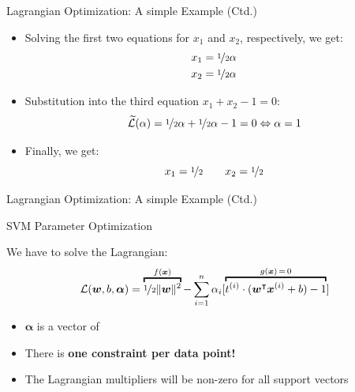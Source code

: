 \begin{frame}{Lagrangian Optimization: A simple Example (Ctd.)}{}
	\begin{itemize}
		\item Solving the first two equations for $x_1$ and $x_2$, respectively, we get:
		\begin{align}
			x_1 &= \nicefrac{1}{2} \alpha \\
			x_2 &= \nicefrac{1}{2} \alpha
		\end{align}
		\item Substitution into the third equation $x_1 + x_2 - 1 = 0$:
		\begin{equation}
			\widetilde{\mathcal{L}}(\alpha) =
				\nicefrac{1}{2} \alpha + \nicefrac{1}{2} \alpha - 1 = 0 \Leftrightarrow \alpha = 1
		\end{equation}
		\item Finally, we get:
		\begin{equation*}
			x_1 = \nicefrac{1}{2} \qquad x_2 = \nicefrac{1}{2}
		\end{equation*}
	\end{itemize}
\end{frame}


\begin{frame}{Lagrangian Optimization: A simple Example (Ctd.)}{}
	
\end{frame}


\begin{frame}{SVM Parameter Optimization}{}
	\begin{boxBlueNoFrame}
		We have to solve the Lagrangian:
		\begin{equation}
			\mathcal{L}(\bm{w}, b, \bm{\alpha}) = \overbracket{
				\nicefrac{1}{2} \Vert \bm{w} \Vert^2
			}^{f(\bm{x})} -
			\sum_{i=1}^n \alpha_i [\overbracket{
				t^{(i)} \cdot (\bm{w}^{\intercal} \bm{x}^{(i)} + b) - 1
			}^{g(\bm{x})\, =\, 0}]
		\end{equation}
	\end{boxBlueNoFrame}
	\begin{itemize}
		\item $\bm{\alpha}$ is a vector of 
		\item There is \textbf{one constraint per data point!}
		\item The Lagrangian multipliers will be non-zero for all support vectors
	\end{itemize}
\end{frame}



